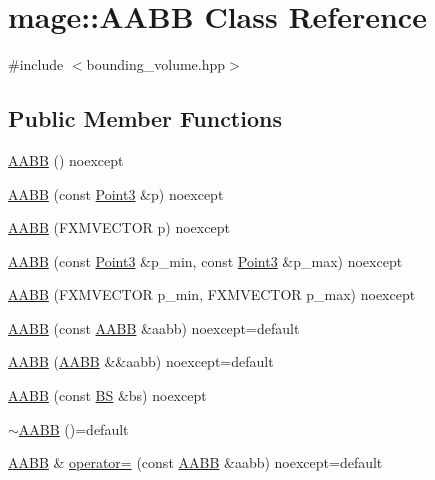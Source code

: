 \hypertarget{classmage_1_1_a_a_b_b}{}\section{mage\+:\+:A\+A\+BB Class Reference}
\label{classmage_1_1_a_a_b_b}


{\ttfamily \#include $<$bounding\+\_\+volume.\+hpp$>$}

\subsection*{Public Member Functions}
\begin{DoxyCompactItemize}
\item 
\hyperlink{classmage_1_1_a_a_b_b_a4bf8c44135580cda2ab0c78da14c634e}{A\+A\+BB} () noexcept
\item 
\hyperlink{classmage_1_1_a_a_b_b_a97a4a755cb0b9c017fd5a311576a5c00}{A\+A\+BB} (const \hyperlink{structmage_1_1_point3}{Point3} \&p) noexcept
\item 
\hyperlink{classmage_1_1_a_a_b_b_a1876b5d2aaaef6409983395d7d5a2c04}{A\+A\+BB} (F\+X\+M\+V\+E\+C\+T\+OR p) noexcept
\item 
\hyperlink{classmage_1_1_a_a_b_b_a3d62727af89f01bbe4026da9093dc682}{A\+A\+BB} (const \hyperlink{structmage_1_1_point3}{Point3} \&p\+\_\+min, const \hyperlink{structmage_1_1_point3}{Point3} \&p\+\_\+max) noexcept
\item 
\hyperlink{classmage_1_1_a_a_b_b_a1b3e825922055027b53151c8eeb419ad}{A\+A\+BB} (F\+X\+M\+V\+E\+C\+T\+OR p\+\_\+min, F\+X\+M\+V\+E\+C\+T\+OR p\+\_\+max) noexcept
\item 
\hyperlink{classmage_1_1_a_a_b_b_abfd1c0d221df7aacc29b06afcd609994}{A\+A\+BB} (const \hyperlink{classmage_1_1_a_a_b_b}{A\+A\+BB} \&aabb) noexcept=default
\item 
\hyperlink{classmage_1_1_a_a_b_b_ad679d44369d5300de286e1fef947df1f}{A\+A\+BB} (\hyperlink{classmage_1_1_a_a_b_b}{A\+A\+BB} \&\&aabb) noexcept=default
\item 
\hyperlink{classmage_1_1_a_a_b_b_ac4038bab3991c79b455856323cb92436}{A\+A\+BB} (const \hyperlink{classmage_1_1_b_s}{BS} \&bs) noexcept
\item 
\hyperlink{classmage_1_1_a_a_b_b_a0fa31372f7488cb30b886c77bd676f17}{$\sim$\+A\+A\+BB} ()=default
\item 
\hyperlink{classmage_1_1_a_a_b_b}{A\+A\+BB} \& \hyperlink{classmage_1_1_a_a_b_b_a11ba6858dfeaf17cc3e297385c925a8b}{operator=} (const \hyperlink{classmage_1_1_a_a_b_b}{A\+A\+BB} \&aabb) noexcept=default

\end{DoxyCompactItemize}
